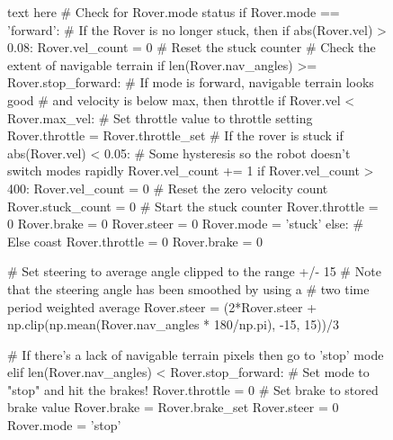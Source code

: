 \documentclass[a4paper]{article}
\begin{document}
\begin{figure}[h]\scriptsize
\begin{sexylisting}{text here}
# Check for Rover.mode status
        if Rover.mode == 'forward':
            # If the Rover is no longer stuck, then 
            if abs(Rover.vel) > 0.08:
                Rover.vel_count = 0 # Reset the stuck counter
            # Check the extent of navigable terrain
            if len(Rover.nav_angles) >= Rover.stop_forward:  
                # If mode is forward, navigable terrain looks good 
                # and velocity is below max, then throttle 
                if Rover.vel < Rover.max_vel:
                    # Set throttle value to throttle setting
                    Rover.throttle = Rover.throttle_set
                    # If the rover is stuck
                    if abs(Rover.vel) < 0.05:
                        # Some hysteresis so the robot doesn't switch modes rapidly
                        Rover.vel_count += 1
                        if Rover.vel_count > 400:
                            Rover.vel_count = 0 # Reset the zero velocity count
                            Rover.stuck_count = 0 # Start the stuck counter
                            Rover.throttle = 0
                            Rover.brake = 0
                            Rover.steer = 0
                            Rover.mode = 'stuck'
                else: # Else coast
                    Rover.throttle = 0
                Rover.brake = 0
                
                # Set steering to average angle clipped to the range +/- 15
                # Note that the steering angle has been smoothed by using a
                # two time period weighted average
                Rover.steer =
	                (2*Rover.steer +
		                 np.clip(np.mean(Rover.nav_angles * 180/np.pi), -15, 15))/3
                
            # If there's a lack of navigable terrain pixels then go to 'stop' mode
            elif len(Rover.nav_angles) < Rover.stop_forward:
                    # Set mode to "stop" and hit the brakes!
                    Rover.throttle = 0
                    # Set brake to stored brake value
                    Rover.brake = Rover.brake_set
                    Rover.steer = 0
                    Rover.mode = 'stop'
\end{sexylisting}
\end{figure}
\end{document}
